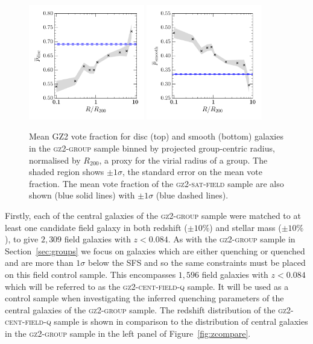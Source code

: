 \documentclass[useAMS,usenatbib]{mn2e}
\begin{document}
\begin{figure}
\includegraphics[width=0.45\textwidth]{p_disc_trend_with_log_radius_field_compare.pdf}
\includegraphics[width=0.45\textwidth]{p_smooth_trend_with_log_radius_field_compare.pdf}
\caption[Mean $p_d$ and $p_s$ with group radius in the \textsc{gz2-group} sample]{Mean GZ2 vote fraction for disc (top) and smooth (bottom) galaxies in the \textsc{gz2-group} sample binned by projected group-centric radius, normalised by $R_{200}$, a proxy for the virial radius of a group. The shaded region shows $\pm1\sigma$, the standard error on the mean vote fraction. The mean vote fraction of the \textsc{gz2-sat-field} sample are also shown (blue solid lines) with $\pm1\sigma$ (blue dashed lines).}
\label{fig:morphradius}
\end{figure}

Firstly, each of the central galaxies of the \textsc{gz2-group} sample were matched to at least one candidate field galaxy in both redshift ($\pm10\%$) and stellar mass ($\pm10\%$), to give $2,309$ field galaxies with $z < 0.084$. As with the \textsc{gz2-group} sample in Section~\ref{sec:groups} we focus on galaxies which are either quenching or quenched and are more than $1\sigma$ below the SFS and so the same constraints must be placed on this field control sample. This encompasses $1,596$ field galaxies with $z < 0.084$ which will be referred to as the \textsc{gz2-cent-field-q} sample. It will be used as a control sample when investigating the inferred quenching parameters of the central galaxies of the \textsc{gz2-group} sample. The redshift distribution of the \textsc{gz2-cent-field-q} sample is shown in comparison to the distribution of central galaxies in the \textsc{gz2-group} sample in the left panel of Figure~\ref{fig:zcompare}. 
\end{document}
